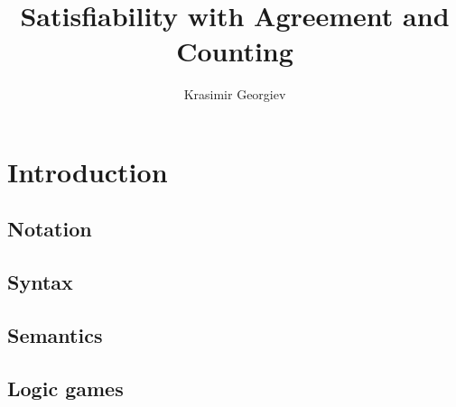 \documentclass{scrbook}
\begin{document}
\frontmatter
\title{Satisfiability with Agreement and Counting}
\author{Krasimir Georgiev}
\maketitle
\tableofcontents
\printglossary[style=mcolindex]

\mainmatter
\chapter{Introduction}
\section{Notation}












\section{Syntax}







\section{Semantics}






\section{Logic games}\label{sec:logic-games}

\end{document}
